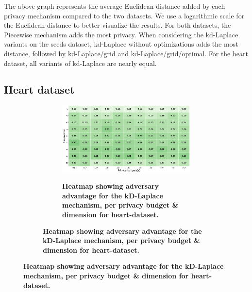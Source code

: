 The above graph represents the average Euclidean distance added by each privacy mechanism compared to the two datasets. We use a logarithmic scale for the Euclidean distance to better visualize the results.
For both datasets, the Piecewise mechanism adds the most privacy. When considering the kd-Laplace variants on the seeds dataset, kd-Laplace without optimizations adds the most distance, followed by kd-Laplace/grid and kd-Laplace/grid/optimal. For the heart dataset, all variants of kd-Laplace are nearly equal.
\newpage

\subsection{Heart dataset}
\begin{figure}[H]
    \centering
    \begin{subfigure}[b]{0.85\textwidth}
        \begin{subfigure}[c]{1\textwidth}
            \caption{\textbf{Heatmap showing adversary advantage for the kD-Laplace mechanism, per privacy budget \& dimension for heart-dataset.}}
            \includegraphics[width=1\textwidth]{Results/kd-laplace/kd-Laplace/heart-dataset/shokri_mi_adv.png}
            \label{fig:privacy_heart-dataset_adversial_advantage_kd-laplace}
        \end{subfigure}
        \vfill %


\end{subfigure}
\end{figure}

